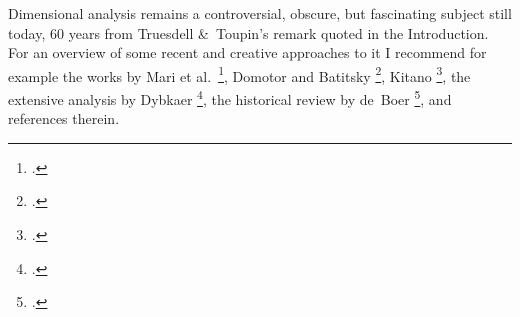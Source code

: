 \documentclass[\ifafour a4paper,12pt,\else a5paper,10pt,\fi%
onecolumn,oneside,article,%
british%
]{memoir}
\makeatletter
\theoremstyle{remark}
\theoremstyle{innote}
\def\sum{\DOTSI\sumop\slimits@}
\newcommand*{\mathte}[1]{\textbf{\textit{\textsf{#1}}}}
\newcommand*{\citep}{\footcites}
\newcommand*{\amp}{\&}
\newcommand*{\de}{\partialup}%
\newcommand*{\p}{\mathrm{P}}%
\renewcommand*{\|}[1][]{\nonscript\,#1\vert\nonscript\;\mathopen{}}
\newcommand*{\sect}{\S}%
\newcommand*{\chap}{ch.}%
\newcommand*{\eqn}{eq.}%
\newcommand*{\eqns}{eqs}%
\newcommand*{\etal}{{et al.}}
\newcommand*{\tsum}{\mathop{\textstyle\sum}\nolimits}
\newcommand*{\yA}{\mathte{A}}
\newcommand*{\yu}{\bm{u}}
\makeatother
\begin{document}

\medskip

Dimensional analysis remains a controversial, obscure, but fascinating
subject still today, 60 years from Truesdell \amp\ Toupin's remark quoted
in the Introduction. For an overview of some recent and creative approaches
to it I recommend for example the works by Mari \etal\
\citep{marietal2012,frigerioetal2010}, Domotor and Batitsky
\citep{domotor2017,domotoretal2016,domotor2012}, Kitano \citep{kitano2013},
the extensive analysis by Dybkaer \citep{dybkaer2004_r2010}, the historical
review by de~Boer \citep{deboer1995}, and references therein.
















 

\end{document}
